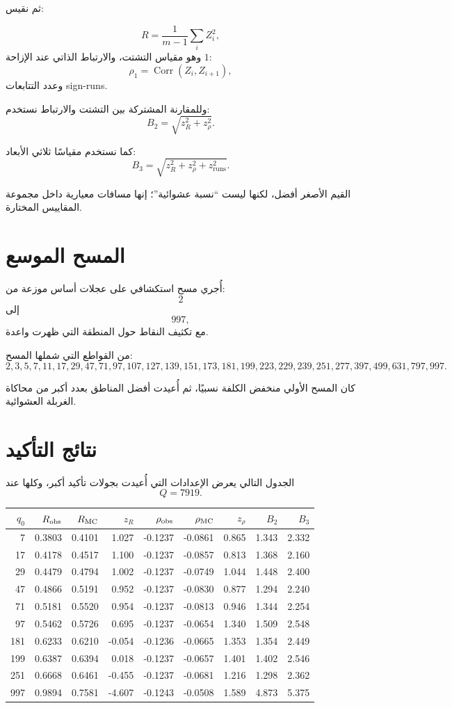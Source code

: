 \documentclass[12pt]{article}
\begin{document}
ثم نقيس:

\[
R
=
\frac{1}{m-1}\sum_i Z_i^2,
\]
وهو مقياس التشتت، والارتباط الذاتي عند الإزاحة \(1\):
\[
\rho_1
=
\operatorname{Corr}(Z_i,Z_{i+1}),
\]
وعدد التتابعات sign-runs.

وللمقارنة المشتركة بين التشتت والارتباط نستخدم:
\[
B_2
=
\sqrt{z_R^2+z_{\rho}^2}.
\]

كما نستخدم مقياسًا ثلاثي الأبعاد:
\[
B_3
=
\sqrt{z_R^2+z_{\rho}^2+z_{\mathrm{runs}}^2}.
\]

القيم الأصغر أفضل، لكنها ليست ``نسبة عشوائية''؛ إنها مسافات معيارية داخل مجموعة المقاييس المختارة.

\section{المسح الموسع}

أُجري مسح استكشافي على عجلات أساس موزعة من:
\[
2
\]
إلى
\[
997,
\]
مع تكثيف النقاط حول المنطقة التي ظهرت واعدة.

من القواطع التي شملها المسح:
\[
2,3,5,7,11,17,29,47,71,97,107,127,139,151,173,181,199,
223,229,239,251,277,397,499,631,797,997.
\]

كان المسح الأولي منخفض الكلفة نسبيًا، ثم أُعيدت أفضل المناطق بعدد أكبر من محاكاة الغربلة العشوائية.

\section{نتائج التأكيد}

الجدول التالي يعرض الإعدادات التي أُعيدت بجولات تأكيد أكبر، وكلها عند
\[
Q=7919.
\]

\begin{center}
\begin{tabular}{rrrrrrrrr}
\toprule
\(q_0\) &
\(R_{\rm obs}\) &
\(R_{\rm MC}\) &
\(z_R\) &
\(\rho_{\rm obs}\) &
\(\rho_{\rm MC}\) &
\(z_\rho\) &
\(B_2\) &
\(B_3\)\\
\midrule
7   & 0.3803 & 0.4101 &  1.027 & -0.1237 & -0.0861 & 0.865 & 1.343 & 2.332\\
17  & 0.4178 & 0.4517 &  1.100 & -0.1237 & -0.0857 & 0.813 & 1.368 & 2.160\\
29  & 0.4479 & 0.4794 &  1.002 & -0.1237 & -0.0749 & 1.044 & 1.448 & 2.400\\
47  & 0.4866 & 0.5191 &  0.952 & -0.1237 & -0.0830 & 0.877 & 1.294 & 2.240\\
71  & 0.5181 & 0.5520 &  0.954 & -0.1237 & -0.0813 & 0.946 & 1.344 & 2.254\\
97  & 0.5462 & 0.5726 &  0.695 & -0.1237 & -0.0654 & 1.340 & 1.509 & 2.548\\
181 & 0.6233 & 0.6210 & -0.054 & -0.1236 & -0.0665 & 1.353 & 1.354 & 2.449\\
199 & 0.6387 & 0.6394 &  0.018 & -0.1237 & -0.0657 & 1.401 & 1.402 & 2.546\\
251 & 0.6668 & 0.6461 & -0.455 & -0.1237 & -0.0681 & 1.216 & 1.298 & 2.362\\
997 & 0.9894 & 0.7581 & -4.607 & -0.1243 & -0.0508 & 1.589 & 4.873 & 5.375\\
\bottomrule
\end{tabular}
\end{center}
\end{document}
